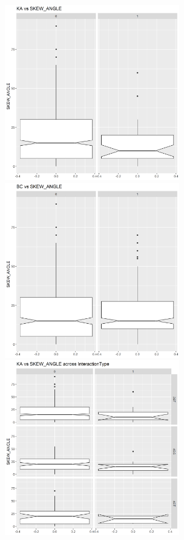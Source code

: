 \documentclass[11pt]{scrartcl} %
\begin{document}
\begin{figure}[H]
\begin{minipage}[t]{0.5\linewidth}
\centering
\includegraphics[width=3in]{image/extra9.png}
\small
\end{minipage}
\begin{minipage}[t]{0.5\linewidth}
\centering
\includegraphics[width=3in]{image/extra10.png}
\small
\end{minipage}
\begin{minipage}[t]{0.5\linewidth}
\centering
\includegraphics[width=3in]{image/extra11.png}

\end{minipage}
\end{figure}
\end{document}
